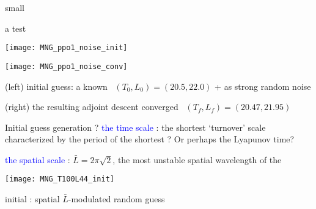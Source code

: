 \begin{frame}{small \twot}
\begin{block}{a test}
\begin{minipage}[height=.32\textheight]{.35\textwidth}
\centering %
\texttt{[image: MNG\_ppo1\_noise\_init]}
\end{minipage}
\begin{minipage}[height=.32\textheight]{.35\textwidth}
\centering %
\texttt{[image: MNG\_ppo1\_noise\_conv]}
\end{minipage}
\end{block}

\bigskip

(left) initial guess: a known %
\twot\
$(T_0,L_0)=(20.5,22.0)$
+
as strong random noise

\bigskip

(right) the resulting adjoint descent converged \twot\
$(T_f,L_f)=(20.47,21.95)$
\end{frame}

\begin{frame}{Initial guess generation ?}
 \textcolor{blue}{the time scale} : the shortest
`turnover' scale characterized by the period of the shortest \po? Or perhaps
the Lyapunov time?

\bigskip

\textcolor{blue}{the spatial scale} :
$\bar{L}=2\pi\sqrt{2}$, the  most unstable spatial wavelength of the \KS

\bigskip

\begin{minipage}[height=.32\textheight]{.30\textwidth}
\texttt{[image: MNG\_T100L44\_init]}
\end{minipage}

\medskip
initial : spatial $\bar{L}$-modulated random guess

\end{frame}

